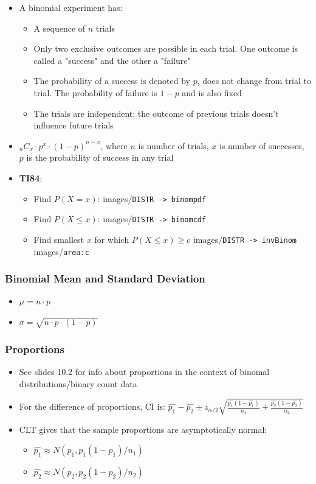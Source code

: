 \documentclass{article}
\newcommand{\code}[1]{images/\colorbox{light-gray}{\texttt{#1}}}
\begin{document}
\begin{itemize}
    \item A binomial experiment has:
    \begin{itemize}
        \item A sequence of $n$ trials
        \item Only two exclusive outcomes are possible in each trial. One outcome is called a "success" and the other a "failure"
        \item The probability of a success is denoted by $p$, does not change from trial to trial. The probability of failure is $1-p$ and is also fixed
        \item The trials are independent; the outcome of previous trials doesn't influence future trials
    \end{itemize}
    \item $_nC_x \cdot p^x \cdot (1-p)^{n-x}$, where $n$ is number of trials, $x$ is number of successes, $p$ is the probability of success in any trial
    \item \textbf{TI84}:
    \begin{itemize}
        \item Find $P(X=x)$: \code{DISTR -> binompdf}
        \item Find $P(X \leq x)$: \code{DISTR -> binomcdf}
        \item Find smallest $x$ for which $P(X \leq x) \geq c$ \code{DISTR -> invBinom} \code{area:c}
    \end{itemize}
\end{itemize}

\subsubsection{Binomial Mean and Standard Deviation}

\begin{itemize}
    \item $\mu=n \cdot p$
    \item $\sigma = \sqrt{n \cdot p \cdot (1-p)}$
\end{itemize}

\subsubsection{Proportions}

\begin{itemize}
    \item See slides 10.2 for info about proportions in the context of binomal distributions/binary count data
    \item For the difference of proportions, CI is: $\hat{p_1}-\hat{p_2} \pm z_{\alpha/2} \sqrt{\frac{\hat{p_1}(1-\hat{p_1})}{n_1}+\frac{\hat{p_2}(1-\hat{p_2})}{n_2}}$
    \item CLT gives that the sample proportions are asymptotically normal:
    \begin{itemize}
        \item $\hat{p_1} \approx N(p_1,p_1(1-p_1)/n_1)$
        \item $\hat{p_2} \approx N(p_2,p_2(1-p_2)/n_2)$
    \end{itemize}
\end{itemize}
\end{document}
